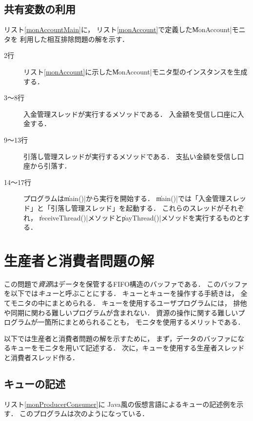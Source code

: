 \subsection{共有変数の利用}
リスト\ref{monAccountMain}に，
リスト\ref{monAccount}で定義した\|MonAccount|モニタを
利用した相互排除問題の解を示す．



\begin{description}
\item [2行]
  リスト\ref{monAccount}に示した\|MonAccount|モニタ型のインスタンスを生成する．
\item [3〜8行]
  入金管理スレッドが実行するメソッドである．
  入金額を受信し口座に入金する．
\item [9〜13行]
  引落し管理スレッドが実行するメソッドである．
  支払い金額を受信し口座から引落す．
\item [14〜17行]
  プログラムは\|main()|から実行を開始する．
  \|main()|では「入金管理スレッド」と「引落し管理スレッド」を起動する．
  これらのスレッドがそれぞれ，
  \|receiveThread()|メソッドと\|payThread()|メソッドを実行するものとする．
\end{description}

\section{生産者と消費者問題の解}
この問題で\emph{資源}はデータを保管するFIFO構造のバッファである．
このバッファを以下では\emph{キュー}と呼ぶことにする．
キューとキューを操作する手続きは，
全てモニタの中にまとめられる．
キューを使用するユーザプログラムには，
排他や同期に関わる難しいプログラムが含まれない．
資源の操作に関する難しいプログラムが一箇所にまとめられることも，
モニタを使用するメリットである．

以下では生産者と消費者問題の解を示すために，
まず，データのバッファになるキューをモニタを用いて記述する．
次に，キューを使用する生産者スレッドと消費者スレッド作る．

\subsection{キューの記述}
リスト\ref{monProducerConsumer}に
Java風の仮想言語によるキューの記述例を示す．
このプログラムは次のようになっている．

